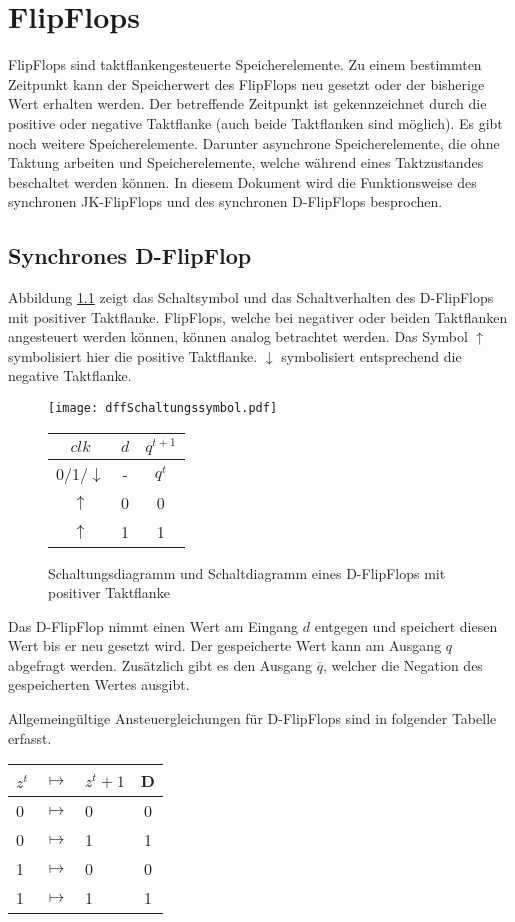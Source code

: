 \chapter{FlipFlops}
FlipFlops sind taktflankengesteuerte Speicherelemente. Zu einem bestimmten Zeitpunkt kann der Speicherwert des FlipFlops neu gesetzt oder der bisherige Wert erhalten werden. Der betreffende Zeitpunkt ist gekennzeichnet durch die positive oder negative Taktflanke (auch beide Taktflanken sind möglich). Es gibt noch weitere Speicherelemente. Darunter asynchrone Speicherelemente, die ohne Taktung arbeiten und Speicherelemente, welche während eines Taktzustandes beschaltet werden können. In diesem Dokument wird die Funktionsweise des synchronen JK-FlipFlops und des synchronen D-FlipFlops besprochen. 

\section{Synchrones D-FlipFlop}
Abbildung \ref{dffSym} zeigt das Schaltsymbol und das Schaltverhalten des D-FlipFlops mit positiver Taktflanke. FlipFlops, welche bei negativer oder beiden Taktflanken angesteuert werden können, können analog betrachtet werden. Das Symbol $\uparrow$ symbolisiert hier die positive Taktflanke. $\downarrow$ symbolisiert entsprechend die negative Taktflanke.
\begin{figure}[htp]
	\centering
	\texttt{[image: dffSchaltungssymbol.pdf]}
	
	\vspace{6pt}
	
	\begin{tabular}{ccc}
		$clk$            & $d$ & $q^{t+1}$ \\ \hline
		0/1/$\downarrow$ & -   & $q^t$     \\
		$\uparrow$       & 0   & 0         \\
		$\uparrow$       & 1   & 1         \\		
	\end{tabular}
	\caption{Schaltungsdiagramm und Schaltdiagramm eines D-FlipFlops mit positiver Taktflanke}
	\label{dffSym}
\end{figure}

Das D-FlipFlop nimmt einen Wert am Eingang $d$ entgegen und speichert diesen Wert bis er neu gesetzt wird. Der gespeicherte Wert kann am Ausgang $q$ abgefragt werden. Zusätzlich gibt es den Ausgang $\overline{q}$, welcher die Negation des gespeicherten Wertes ausgibt.

Allgemeingültige Ansteuergleichungen für D-FlipFlops sind in folgender Tabelle erfasst.
\begin{center}
\begin{tabular}{lcl|c}
$z^t$ & $\mapsto$ & $z^t+1$ & D\\ \hline
0 & $\mapsto$ & 0 & 0\\
0 & $\mapsto$ & 1 & 1\\
1 & $\mapsto$ & 0 & 0\\
1 & $\mapsto$ & 1 & 1\\
\end{tabular}
\end{center} 

